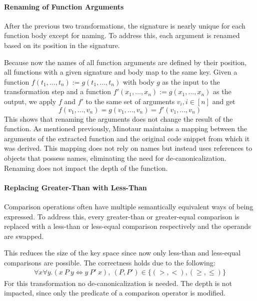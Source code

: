 	\paragraph{Renaming of Function Arguments}
	After the previous two transformations, the signature is nearly unique for each function body except for naming.
	To address this, each argument is renamed based on its position in the signature.
	
	Because now the names of all function arguments are defined by their position, all functions with a given signature and body map to the same key.
	Given a function $f(t_1, ..., t_n) := g(t_1, ..., t_n)$ with body $g$ as the input to the transformation step and a function $f'(x_1, ..., x_n) := g(x_1, ..., x_n)$ as the output,  we apply $f$ and $f'$ to the same set of arguments $v_i, i \in [n]$ and get
	\[
		f(v_1, ..., v_n) = g(v_1, ...,v_n) = f'(v_1, ..., v_n)
	\]
	This shows that renaming the arguments does not change the result of the function.
	As mentioned previously, Minotaur maintains a mapping between the arguments of the extracted function and the original code snippet from which it was derived.
	This mapping does not rely on names but instead uses references to objects that possess names, eliminating the need for de-canonicalization.
	Renaming does not impact the depth of the function.
	
	\paragraph{Replacing Greater-Than with Less-Than}
	Comparison operations often have multiple semantically equivalent ways of being expressed.
	To address this, every greater-than or greater-equal comparison is replaced with a less-than or less-equal comparison respectively and the operands are swapped.

	This reduces the size of the key space since now only less-than and less-equal comparisons are possible.
	The correctness holds due to the following:
	\begin{align*}
		\forall x \forall y . (x\ P\ y \iff y\ P'\ x) ,\ (P, P') \in \{(>, <), (\geq, \leq)\}
	\end{align*}
	For this transformation no de-canonicalization is needed.
	The depth is not impacted, since only the predicate of a comparison operator is modified.

